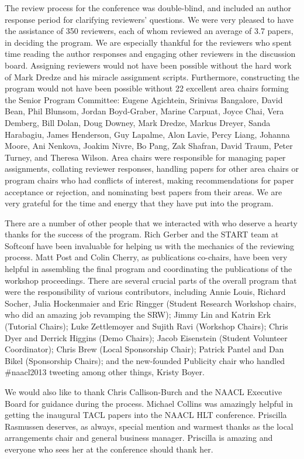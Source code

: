 \begin{large}
The review process for the conference was double-blind, and included an author response period for
clarifying reviewers’ questions. We were very pleased to have the assistance of 350 reviewers, each of whom reviewed an average of 3.7 papers, in deciding the program. We are especially thankful for the reviewers who spent time reading the author responses and engaging other reviewers in the discussion board. Assigning reviewers would not have been possible without the hard work of Mark Dredze and his miracle assignment scripts. Furthermore, constructing the program would not have been possible without 22 excellent area chairs forming the Senior Program Committee: Eugene Agichtein, Srinivas Bangalore, David Bean, Phil Blunsom, Jordan Boyd-Graber, Marine Carpuat, Joyce Chai, Vera Demberg, Bill Dolan, Doug Downey, Mark Dredze, Markus Dreyer, Sanda Harabagiu, James Henderson, Guy Lapalme, Alon Lavie, Percy Liang, Johanna Moore, Ani Nenkova, Joakim Nivre, Bo Pang, Zak Shafran, David Traum, Peter Turney, and Theresa Wilson. Area chairs were responsible for managing paper assignments, collating reviewer responses, handling papers for other area chairs or program chairs who had conflicts of interest, making recommendations for paper acceptance or rejection, and nominating best papers from their areas. We are very grateful for the time and energy that they have put into the program.

There are a number of other people that we interacted with who deserve a hearty thanks for the success of the program. Rich Gerber and the START team at Softconf have been invaluable for helping us with the mechanics of the reviewing process. Matt Post and Colin Cherry, as publications co-chairs, have been very helpful in assembling the final program and coordinating the publications of the workshop proceedings. There are several crucial parts of the overall program that were the responsibility of various contributors, including Annie Louis, Richard Socher, Julia Hockenmaier and Eric Ringger (Student Research Workshop chairs, who did an amazing job revamping the SRW); Jimmy Lin and Katrin Erk (Tutorial Chairs); Luke Zettlemoyer and Sujith Ravi (Workshop Chairs); Chris Dyer and Derrick Higgins (Demo Chairs); Jacob Eisenstein (Student Volunteer Coordinator); Chris Brew (Local Sponsorship Chair); Patrick Pantel and Dan Bikel (Sponsorship Chairs); and the new-founded Publicity chair who handled \#naacl2013 tweeting among other things, Kristy Boyer.

We would also like to thank Chris Callison-Burch and the NAACL Executive Board for guidance during the process. Michael Collins was amazingly helpful in getting the inaugural TACL papers into the NAACL HLT conference. Priscilla Rasmussen deserves, as always, special mention and warmest thanks as the local arrangements chair and general business manager. Priscilla is amazing and everyone who sees her at the conference should thank her.


\end{large}
